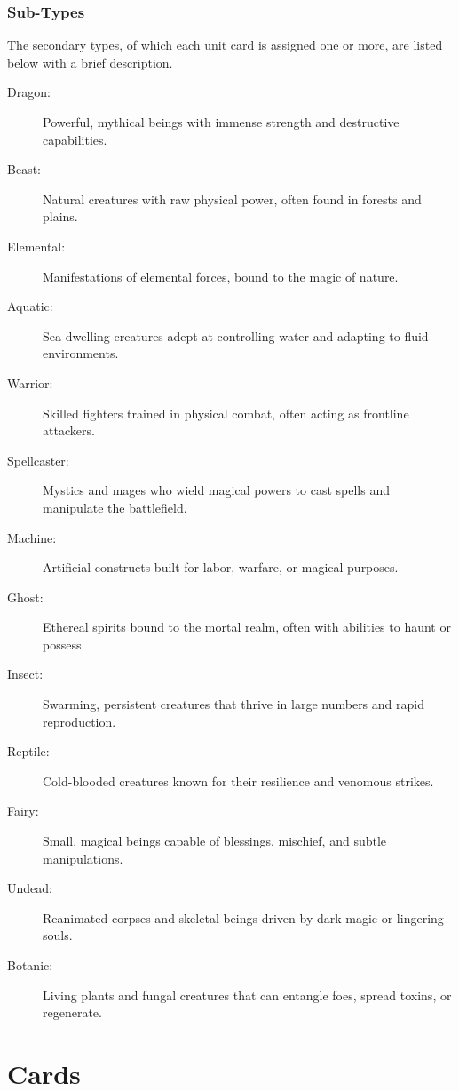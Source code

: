 \subsubsection{Sub-Types}
The secondary types, of which each unit card is assigned one or more, are listed below with a brief description.
\begin{description}
	\item[Dragon:] Powerful, mythical beings with immense strength and destructive capabilities.
	\item[Beast:] Natural creatures with raw physical power, often found in forests and plains.
	\item[Elemental:] Manifestations of elemental forces, bound to the magic of nature.
	\item[Aquatic:] Sea-dwelling creatures adept at controlling water and adapting to fluid environments.
	\item[Warrior:] Skilled fighters trained in physical combat, often acting as frontline attackers.
	\item[Spellcaster:] Mystics and mages who wield magical powers to cast spells and manipulate the battlefield.
	\item[Machine:] Artificial constructs built for labor, warfare, or magical purposes.
	\item[Ghost:] Ethereal spirits bound to the mortal realm, often with abilities to haunt or possess.
	\item[Insect:] Swarming, persistent creatures that thrive in large numbers and rapid reproduction.
	\item[Reptile:] Cold-blooded creatures known for their resilience and venomous strikes.
	\item[Fairy:] Small, magical beings capable of blessings, mischief, and subtle manipulations.
	\item[Undead:] Reanimated corpses and skeletal beings driven by dark magic or lingering souls.
	\item[Botanic:] Living plants and fungal creatures that can entangle foes, spread toxins, or regenerate.
\end{description}




\section{Cards}

